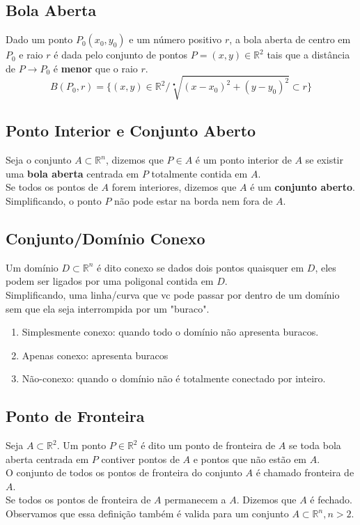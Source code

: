 \documentclass{article}
\begin{document}
		\subsection{Bola Aberta}
			Dado um ponto $P_0(x_0,y_0)$ e um número positivo $r$, a bola aberta de centro em $P_0$ e raio $r$ é dada pelo conjunto de pontos $P=(x,y) \in \mathbb{R}^2$ tais que a distância de $P \to P_0$ é \textbf{menor} que o raio $r$.
			$$B(P_0,r) = \{(x,y)\in \mathbb{R}^2 / \sqrt[•]{(x-x_0)^2+(y-y_0)^2} \subset r\}$$
		\subsection{Ponto Interior e Conjunto Aberto}
			Seja o conjunto $A \subset \mathbb{R}^n$, dizemos que $P \in A$ é um ponto interior de $A$ se existir uma \textbf{bola aberta} centrada em $P$ totalmente contida em $A$.\\
			Se todos os pontos de $A$ forem interiores, dizemos que $A $ é um \textbf{conjunto aberto}.\\
			Simplificando, o ponto $P$ não pode estar na borda nem fora de $A$.
		\subsection{Conjunto/Domínio Conexo}
			Um domínio $D\subset\mathbb{R}^n$ é dito conexo se dados dois pontos quaisquer em $D$, eles podem ser ligados por uma poligonal contida em $D$.\\
			Simplificando, uma linha/curva que vc pode passar por dentro de um domínio sem que ela seja interrompida por um "buraco".
			\begin{enumerate}
				\item Simplesmente conexo: quando todo o domínio não apresenta buracos.
				\item Apenas conexo: apresenta buracos
				\item Não-conexo: quando o domínio não é totalmente conectado por inteiro.
			\end{enumerate}
		\subsection{Ponto de Fronteira}
			Seja $A \subset \mathbb{R}^2$. Um ponto $P \in \mathbb{R}^2$ é dito um ponto de fronteira de $A$ se toda bola aberta centrada em $P$ contiver pontos de $A$ e pontos que não estão em $A$.\\
			O conjunto de todos os pontos de fronteira do conjunto $A$ é chamado fronteira de $A$.\\
			Se todos os pontos de fronteira de $A$ permanecem a $A$. Dizemos que $A$ é fechado.\\
		Observamos que essa definição também é valida para um conjunto $A \subset \mathbb{R}^n, n >2$.
\end{document}
